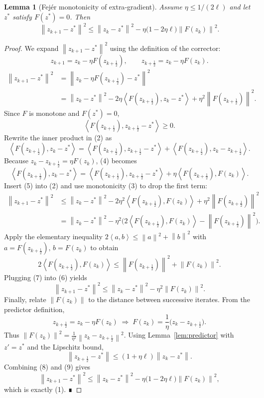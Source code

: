 \documentclass{article}
\newtheorem{lemma}{Lemma}
\newcommand{\norm}[1]{\left\lVert #1\right\rVert}
\newcommand{\inner}[2]{\left\langle #1,#2\right\rangle}
\begin{document}
\begin{lemma}[Fejér monotonicity of extra‑gradient]\label{lem:fejer}
Assume \(\eta\le 1/(2\ell)\) and let \(z^{*}\) satisfy \(F(z^{*})=0\). Then
\[
\norm{z_{k+1}-z^{*}}^{2}\le \norm{z_{k}-z^{*}}^{2}
-\eta\bigl(1-2\eta\ell\bigr)\norm{F(z_{k})}^{2}.
\tag{1}
\]
\end{lemma}
\begin{proof}
We expand \(\norm{z_{k+1}-z^{*}}^{2}\) using the definition of the corrector:
\[
z_{k+1}=z_{k}-\eta F(z_{k+\frac12}),\qquad
z_{k+\frac12}=z_{k}-\eta F(z_{k}).
\]
\begin{align*}
\norm{z_{k+1}-z^{*}}^{2}
&=\norm{z_{k}-\eta F(z_{k+\frac12})-z^{*}}^{2}\\
&=\norm{z_{k}-z^{*}}^{2}
-2\eta\inner{F(z_{k+\frac12})}{z_{k}-z^{*}}
+\eta^{2}\norm{F(z_{k+\frac12})}^{2}. \tag{2}
\end{align*}
Since \(F\) is monotone and \(F(z^{*})=0\),
\[
\inner{F(z_{k+\frac12})}{z_{k+\frac12}-z^{*}}\ge 0.
\tag{3}
\]
Rewrite the inner product in (2) as
\[
\inner{F(z_{k+\frac12})}{z_{k}-z^{*}}
=\inner{F(z_{k+\frac12})}{z_{k+\frac12}-z^{*}}
+\inner{F(z_{k+\frac12})}{z_{k}-z_{k+\frac12}} .
\tag{4}
\]
Because \(z_{k}-z_{k+\frac12}= \eta F(z_{k})\), (4) becomes
\[
\inner{F(z_{k+\frac12})}{z_{k}-z^{*}}
=\inner{F(z_{k+\frac12})}{z_{k+\frac12}-z^{*}}
+\eta\inner{F(z_{k+\frac12})}{F(z_{k})}.
\tag{5}
\]
Insert (5) into (2) and use monotonicity (3) to drop the first term:
\[
\begin{aligned}
\norm{z_{k+1}-z^{*}}^{2}
&\le \norm{z_{k}-z^{*}}^{2}
-2\eta^{2}\inner{F(z_{k+\frac12})}{F(z_{k})}
+\eta^{2}\norm{F(z_{k+\frac12})}^{2}\\
&= \norm{z_{k}-z^{*}}^{2}
-\eta^{2}\bigl(2\inner{F(z_{k+\frac12})}{F(z_{k})}
-\norm{F(z_{k+\frac12})}^{2}\bigr). \tag{6}
\end{aligned}
\]
Apply the elementary inequality
\(2\inner{a}{b}\le \norm{a}^{2}+\norm{b}^{2}\) with
\(a=F(z_{k+\frac12}),\,b=F(z_{k})\) to obtain
\[
2\inner{F(z_{k+\frac12})}{F(z_{k})}
\le \norm{F(z_{k+\frac12})}^{2}+\norm{F(z_{k})}^{2}.
\tag{7}
\]
Plugging (7) into (6) yields
\[
\norm{z_{k+1}-z^{*}}^{2}
\le \norm{z_{k}-z^{*}}^{2}
-\eta^{2}\norm{F(z_{k})}^{2}. \tag{8}
\]
Finally, relate \(\norm{F(z_{k})}\) to the distance between successive iterates.
From the predictor definition,
\[
z_{k+\frac12}=z_{k}-\eta F(z_{k})\;\Longrightarrow\;
F(z_{k})=\frac{1}{\eta}\bigl(z_{k}-z_{k+\frac12}\bigr).
\]
Thus \(\norm{F(z_{k})}^{2}= \frac{1}{\eta^{2}}\norm{z_{k}-z_{k+\frac12}}^{2}\).
Using Lemma~\ref{lem:predictor} with \(z'=z^{*}\) and the Lipschitz bound,
\[
\norm{z_{k+\frac12}-z^{*}}
\le (1+\eta\ell)\norm{z_{k}-z^{*}} .
\tag{9}
\]
Combining (8) and (9) gives
\[
\norm{z_{k+1}-z^{*}}^{2}
\le \norm{z_{k}-z^{*}}^{2}
-\eta\bigl(1-2\eta\ell\bigr)\norm{F(z_{k})}^{2},
\]
which is exactly (1).  ∎
\end{proof}
\end{document}
